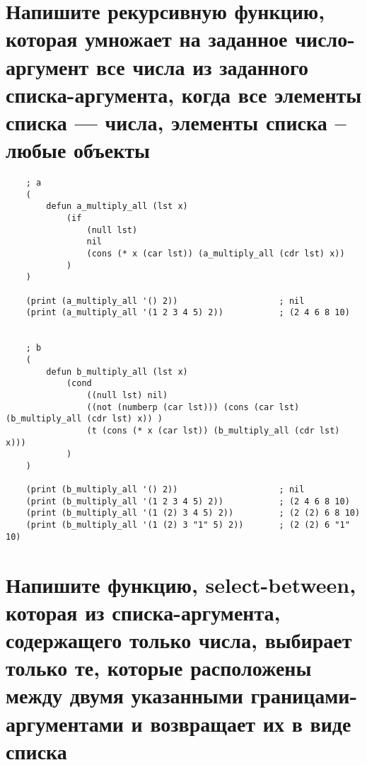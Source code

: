 \section{Напишите рекурсивную функцию, которая умножает на заданное число-аргумент все числа из заданного списка-аргумента, когда все элементы списка --- числа, элементы списка -- любые объекты}

\begin{lstlisting}
    ; a
    (
        defun a_multiply_all (lst x)
            (if
                (null lst)
                nil
                (cons (* x (car lst)) (a_multiply_all (cdr lst) x))
            )
    )
    
    (print (a_multiply_all '() 2))                    ; nil
    (print (a_multiply_all '(1 2 3 4 5) 2))           ; (2 4 6 8 10) 
    
    
    ; b
    (
        defun b_multiply_all (lst x)
            (cond
                ((null lst) nil)
                ((not (numberp (car lst))) (cons (car lst) (b_multiply_all (cdr lst) x)) )
                (t (cons (* x (car lst)) (b_multiply_all (cdr lst) x)))
            )
    )
    
    (print (b_multiply_all '() 2))                    ; nil
    (print (b_multiply_all '(1 2 3 4 5) 2))           ; (2 4 6 8 10) 
    (print (b_multiply_all '(1 (2) 3 4 5) 2))         ; (2 (2) 6 8 10) 
    (print (b_multiply_all '(1 (2) 3 "1" 5) 2))       ; (2 (2) 6 "1" 10) 
\end{lstlisting}

\section{Напишите функцию, select-between, которая из списка-аргумента, содержащего только числа, выбирает только те, которые расположены между двумя указанными границами-аргументами и возвращает их в виде списка}

